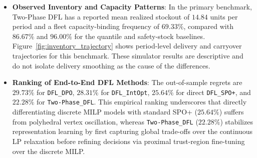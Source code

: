 \documentclass[11pt,a4paper]{article}
\theoremstyle{definition}
\theoremstyle{remark}
\begin{document}
\begin{itemize}[leftmargin=*]
    To see why uncoupled scalar fractiles break down under downstream operational constraints, consider a stylized continuous relaxation of the single-period replenishment subproblem. When customer demand has a differentiable CDF $F_{it}$, overage cost is $c_o$, and the marginal routing cost to serve store $i$ is $\kappa_{it}$, first-order KKT stationarity yields the effective service level:
    \begin{equation}
        F_{it}(S_{it}^*) = \frac{p_u - \lambda_t^* - \kappa_{it}}{p_u + c_o} = \beta^* - \frac{\lambda_t^* + \kappa_{it}}{p_u + c_o}, \label{eq:stylized_kkt}
    \end{equation}
    where $\lambda_t^* \ge 0$ is the dual shadow price on the fleet capacity constraint, and $\beta^* = \frac{p_u}{p_u + c_o}$ is the unconstrained critical fractile. Equation~\eqref{eq:stylized_kkt} shows that the optimal service fractile in this stylized relaxation depends on fleet congestion and store-specific marginal routing cost. A single scalar quantile that omits these terms need not match the state- and store-specific target; this derivation does not imply that scalar quantile methods always over-order at peripheral stores. The reported store-level diagnostics describe shortage concentration for the tested methods and setting.

    \item \textbf{Observed Inventory and Capacity Patterns}: In the primary benchmark, Two-Phase DFL has a reported mean realized stockout of $14.84$ units per period and a fleet capacity-binding frequency of $69.33\%$, compared with $86.67\%$ and $96.00\%$ for the quantile and safety-stock baselines. Figure~\ref{fig:inventory_trajectory} shows period-level delivery and carryover trajectories for this benchmark. These simulator results are descriptive and do not isolate delivery smoothing as the cause of the differences.
    \item \textbf{Ranking of End-to-End DFL Methods}: The out-of-sample regrets are $29.73\%$ for \texttt{DFL\_DPO}, $28.31\%$ for \texttt{DFL\_IntOpt}, $25.64\%$ for direct \texttt{DFL\_SPO+}, and $22.28\%$ for \texttt{Two-Phase\_DFL}. This empirical ranking underscores that directly differentiating discrete MILP models with standard SPO+ ($25.64\%$) suffers from polyhedral vertex oscillation, whereas \texttt{Two-Phase\_DFL} ($22.28\%$) stabilizes representation learning by first capturing global trade-offs over the continuous LP relaxation before refining decisions via proximal trust-region fine-tuning over the discrete MILP.
\end{itemize}
\end{document}
